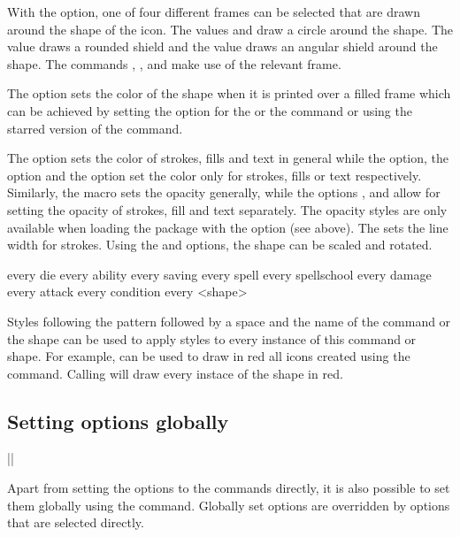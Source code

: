 \documentclass[a4paper]{article}
\begin{document}
With the  option, one of four different frames can be selected that are drawn around the shape of the icon. The values  and  draw a circle around the shape. The value  draws a rounded shield and the value  draws an angular shield around the shape. The commands \macro{\ability}, \macro{\saving}, \macro{\spellschool} and \macro{\damage} make use of the relevant frame.

The  option sets the color of the shape when it is printed over a filled frame which can be achieved by setting the  option for the \macro{\ability} or the \macro{\spellschool} command or using the starred version of the \macro{\DndIconsUseIcon} command.

The  option sets the color of strokes, fills and text in general while the  option, the  option and the  option set the color only for strokes, fills or text respectively. Similarly, the  macro sets the opacity generally, while the options ,  and  allow for setting the opacity of strokes, fill and text separately. The opacity styles are only available when loading the package with the  option (see above). The  sets the line width for strokes. Using the  and  options, the shape can be scaled and rotated.

\begin{macrodef}
every die
every ability
every saving
every spell
every spellschool
every damage
every attack
every condition
every <shape>
\end{macrodef}
Styles following the pattern  followed by a space and the name of the command or the shape can be used to apply styles to every instance of this command or shape. For example,  can be used to draw in red all icons created using the \macro{\die} command. Calling  will draw every instace of the  shape in red.

\subsection{Setting options globally}

\begin{macrodef}
|\dndiconsset|
\end{macrodef}
Apart from setting the options to the commands directly, it is also possible to set them globally using the \macro{\dndiconsset} command. Globally set options are overridden by options that are selected directly.
\end{document}
